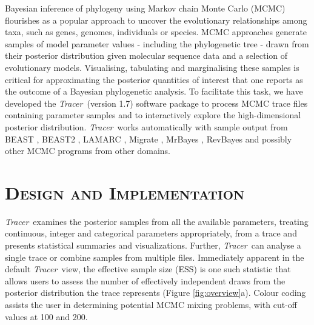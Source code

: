 \documentclass[webpdf,mynatbib,nosurname,nogrid,noCE,noMSC]{SYS}
\newcommand{\tracer}{\emph{Tracer}}
\begin{document}
\indent Bayesian inference of phylogeny using Markov chain Monte Carlo (MCMC) \citep{rannala1996probability, mau1999bayesian, drummond2002estimating} flourishes as a popular approach to uncover the evolutionary relationships among taxa, such as genes, genomes, individuals or species.
MCMC approaches generate samples of model parameter values - including the phylogenetic tree - drawn from their posterior distribution given molecular sequence data and a selection of evolutionary models.
Visualising, tabulating and marginalising these samples is critical for approximating the posterior quantities of interest that one reports as the outcome of a Bayesian phylogenetic analysis.
To facilitate this task, we have developed the \tracer\ (version 1.7) software package to
process MCMC trace files containing parameter samples and to interactively explore the high-dimensional posterior distribution.
\tracer\ works automatically with sample output from BEAST \citep{drummond2012bayesian}, BEAST2 \citep{bouckaert2014beast2},  LAMARC \citep{kuhner2006lamarc},  Migrate \citep{beerli2006comparison}, MrBayes \citep{ronquist2012mrbayes}, RevBayes \citep{hohna2016revbayes} and possibly other MCMC programs from other domains.

\vspace{-2em}
\section*{\textsc{Design and Implementation}}

\tracer\ examines the posterior samples from all the available parameters, treating continuous, integer and categorical parameters appropriately,
from a trace
and presents statistical summaries and visualizations.
Further, \tracer\ can analyse a single trace or combine samples from multiple files.
Immediately apparent in the default \tracer\ view, the effective sample size (ESS) is one such statistic that
allows users to assess the number of effectively independent draws from the posterior distribution the trace represents (Figure \ref{fig:overview}a).
Colour coding assists the user in determining potential MCMC mixing problems, with cut-off values at 100 and 200.
\end{document}
